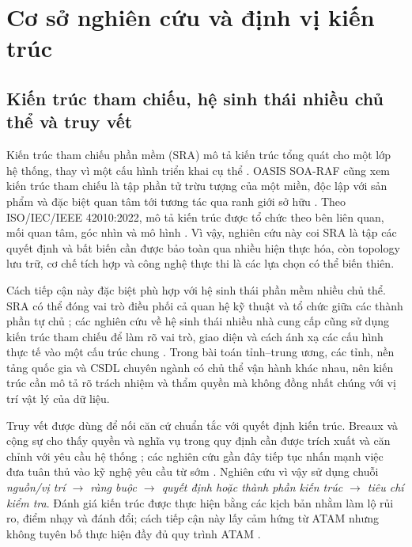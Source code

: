 \section{Cơ sở nghiên cứu và định vị kiến trúc}
\label{sec:background}

\subsection{Kiến trúc tham chiếu, hệ sinh thái nhiều chủ thể và truy vết}
\label{subsec:ra}

Kiến trúc tham chiếu phần mềm (SRA) mô tả kiến trúc tổng quát cho một lớp hệ thống, thay vì một cấu hình triển khai cụ thể \citep{angelov2012}. OASIS SOA-RAF cũng xem kiến trúc tham chiếu là tập phần tử trừu tượng của một miền, độc lập với sản phẩm và đặc biệt quan tâm tới tương tác qua ranh giới sở hữu \citep[pp.~9--14]{oasis_soaraf2012}. Theo ISO/IEC/IEEE 42010:2022, mô tả kiến trúc được tổ chức theo bên liên quan, mối quan tâm, góc nhìn và mô hình \citep{iso42010_2022}. Vì vậy, nghiên cứu này coi SRA là tập các quyết định và bất biến cần được bảo toàn qua nhiều hiện thực hóa, còn topology lưu trữ, cơ chế tích hợp và công nghệ thực thi là các lựa chọn có thể biến thiên.

Cách tiếp cận này đặc biệt phù hợp với hệ sinh thái phần mềm nhiều chủ thể. SRA có thể đóng vai trò điều phối cả quan hệ kỹ thuật và tổ chức giữa các thành phần tự chủ \citep{knodel2016}; các nghiên cứu về hệ sinh thái nhiều nhà cung cấp cũng sử dụng kiến trúc tham chiếu để làm rõ vai trò, giao diện và cách ánh xạ các cấu hình thực tế vào một cấu trúc chung \citep{kruize2016}. Trong bài toán tỉnh--trung ương, các tỉnh, nền tảng quốc gia và CSDL chuyên ngành có chủ thể vận hành khác nhau, nên kiến trúc cần mô tả rõ trách nhiệm và thẩm quyền mà không đồng nhất chúng với vị trí vật lý của dữ liệu.

Truy vết được dùng để nối căn cứ chuẩn tắc với quyết định kiến trúc. Breaux và cộng sự cho thấy quyền và nghĩa vụ trong quy định cần được trích xuất và căn chỉnh với yêu cầu hệ thống \citep{breaux2006}; các nghiên cứu gần đây tiếp tục nhấn mạnh việc đưa tuân thủ vào kỹ nghệ yêu cầu từ sớm \citep{kosenkov2025}. Nghiên cứu vì vậy sử dụng chuỗi \emph{nguồn/vị trí $\rightarrow$ ràng buộc $\rightarrow$ quyết định hoặc thành phần kiến trúc $\rightarrow$ tiêu chí kiểm tra}. Đánh giá kiến trúc được thực hiện bằng các kịch bản nhằm làm lộ rủi ro, điểm nhạy và đánh đổi; cách tiếp cận này lấy cảm hứng từ ATAM nhưng không tuyên bố thực hiện đầy đủ quy trình ATAM \citep[pp.~3, 5--7]{gallagher2000}.

